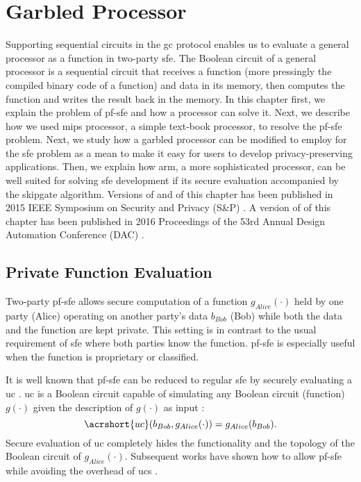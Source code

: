 \chapter{Garbled Processor}\label{chap:processor}
Supporting sequential circuits in the \acrfull{gc} protocol enables us to evaluate a general processor as a function in two-party \acrfull{sfe}.
The Boolean circuit of a general processor is a sequential circuit that receives a function (more pressingly the compiled binary code of a function) and data in its memory, then computes the function and writes the result back in the memory.
In this chapter first, we explain the problem of \acrfull{pf-sfe} and how a processor can solve it.
Next, we describe how we used \gls{mips} processor, a simple text-book processor, to resolve the \acrshort{pf-sfe} problem.
Next, we study how a garbled processor can be modified to employ for the \acrshort{sfe} problem as a mean to make it easy for users to develop privacy-preserving applications.
Then, we explain how \gls{arm}, a more sophisticated processor, can be well suited for solving \acrshort{sfe} development if its secure evaluation accompanied by the \gls{skipgate} algorithm.
Versions of  and  of this chapter has been published in 2015 IEEE Symposium on Security and Privacy (S\&P) \cite{songhori2015tinygarble}.
A version of  of this chapter has been published in 2016 Proceedings of the 53rd Annual Design Automation Conference (DAC) \cite{songhori2016garbledcpu}.


\section{Private Function Evaluation}\label{sec:processor-pfsfe}
Two-party \acrfull{pf-sfe} allows secure computation of a function $g_{Alice}(\cdot)$ held by one party (Alice) operating on another party's data $b_{Bob}$ (Bob) while both the data and the function are kept private.
This setting is in contrast to the usual requirement of \acrshort{sfe} where both parties know the function.
\acrshort{pf-sfe} is especially useful when the function is proprietary or classified.

It is well known that \acrshort{pf-sfe} can be reduced to regular \acrshort{sfe} by securely evaluating a \acrfull{uc} \cite{sander1999non}.
\acrshort{uc} is a Boolean circuit capable of simulating any Boolean circuit (function) $g(\cdot)$ given the description of $g(\cdot)$ as input \cite{valiant1976universal,kolesnikov2008practical}:
$$\acrshort{uc}(b_{Bob},g_{Alice}(\cdot)) = g_{Alice}(b_{Bob}).$$
Secure evaluation of \acrshort{uc} completely hides the functionality and the  topology of the Boolean circuit of $g_{Alice}(\cdot)$.
Subsequent works have shown how to allow \acrshort{pf-sfe} while avoiding the overhead of \acrshort{uc}s \cite{katz2011constant, mohassel2013hide}.

